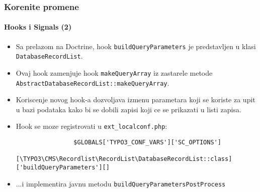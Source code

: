 \begin{frame}[fragile]
	\frametitle{Korenite promene}
	\framesubtitle{Hooks i Signals (2)}

	\lstset{basicstyle=\tiny\ttfamily}

	\begin{itemize}

		\item Sa prelazom na Doctrine, hook \texttt{buildQueryParameters} je predstavljen u klasi
			\texttt{DatabaseRecordList}.

		\item Ovaj hook zamenjuje hook \texttt{makeQueryArray} iz zastarele metode
			\texttt{AbstractDatabaseRecordList::makeQueryArray}.

		\item Koriscenje novog hook-a dozvoljava izmenu parametara koji se koriste za upit u bazi podataka
			kako bi se dobili zapisi koji ce se prikazati u listi zapisa.

		\item Hook se moze registrovati u \texttt{ext\_localconf.php}:

			\begin{lstlisting}
				$GLOBALS['TYPO3_CONF_VARS']['SC_OPTIONS']
				  [\TYPO3\CMS\Recordlist\RecordList\DatabaseRecordList::class]['buildQueryParameters'][]
			\end{lstlisting}

		\item ...i implementira javnu metodu \texttt{buildQueryParametersPostProcess}

	\end{itemize}

\end{frame}

